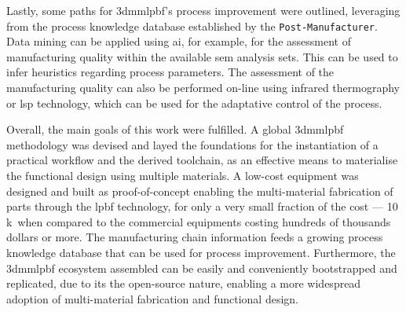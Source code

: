 Lastly, some paths for \gls{3dmmlpbf}'s process improvement were outlined,
leveraging from the process knowledge database established by the
\texttt{Post-Manufacturer}. Data mining can be applied using \gls{ai}, for
example, for the assessment of manufacturing quality within the available
\gls{sem} analysis sets. This can be used to infer heuristics
regarding process parameters. The assessment of the manufacturing quality can
also be performed on-line using infrared thermography or \gls{lsp} technology,
which can be used for the adaptative control of the process.

Overall, the main goals of this work were fulfilled.
A global \gls{3dmmlpbf} methodology was devised and layed the foundations for the instantiation of a practical workflow and the derived
toolchain, as an effective means to materialise the functional design using
multiple materials. A low-cost equipment was designed and built as
proof-of-concept enabling the multi-material fabrication of parts through the
\gls{lpbf} technology, for only a very small fraction of the cost --- 10
k\texteuro~when compared to the commercial equipments costing hundreds of
thousands dollars or more. The manufacturing chain information feeds a growing
process knowledge database that can be used for process
improvement. Furthermore, the \gls{3dmmlpbf} ecosystem assembled can be easily and conveniently bootstrapped and replicated, due to its the
open-source nature, enabling a more widespread adoption of multi-material
fabrication and functional design.
%
